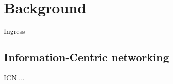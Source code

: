 \chapter{Background}\label{chp:background} 
Ingress


\section{Information-Centric networking}\label{chp2:sec:icn}
\gls{ICN} ...
